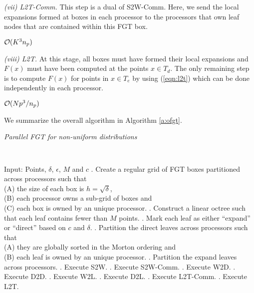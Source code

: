 {\em (vii) L2T-Comm.} This step is a dual of S2W-Comm. Here, we send the local expansions formed at boxes in each processor 
to the processors that own leaf nodes that are contained within this FGT box. 

\hfill $\mathcal{O}(K^3 n_p)$

{\em (viii) L2T.} At this stage, all boxes must have formed their local expansions and $F(x)$ must have been computed at the points $x \in T_d$. The only remaining step is to compute $F(x)$ for points in $x \in T_e$ by using (\ref{eqn:l2t}) which can be done independently in each processor. 

\hfill $\mathcal{O}(N p^3/n_p)$

We summarize the overall algorithm in Algorithm \ref{a:ofgt}.  

\begin{algorithm}[!h]
\caption{ \label{a:ofgt}
\em Parallel FGT for non-uniform distributions}
{\tt
\begin{algorithmic}
\STATE Input: Points, $\delta$, $\epsilon$, $M$ and $c$
. Create a regular grid of FGT boxes partitioned across processors such that \\
 (A) the size of each box is $h = \sqrt{\delta}$, \\
 (B) each processor owns a sub-grid of boxes and \\
 (C) each box is owned by an unique processor. 
. Construct a linear octree such that each leaf contains fewer than $M$ points. 
. Mark each leaf as either ``expand'' or ``direct'' based on $c$ and $\delta$.
. Partition the direct leaves across processors such that \\
  (A) they are globally sorted in the Morton ordering and \\
  (B) each leaf is owned by an unique processor.
. Partition the expand leaves across processors. 
. Execute S2W.
. Execute S2W-Comm.
. Execute W2D.
. Execute D2D.
. Execute W2L.
. Execute D2L.
. Execute L2T-Comm.
. Execute L2T.
\end{algorithmic}
}
\end{algorithm}


